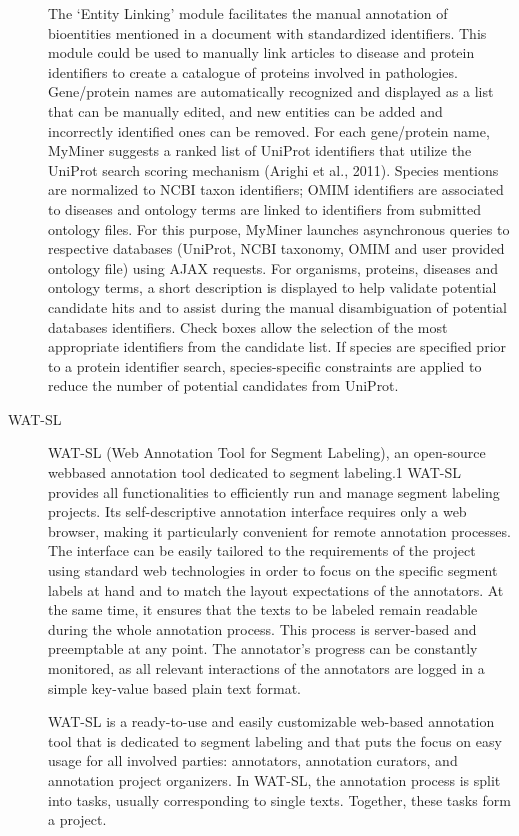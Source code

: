 \begin{description}
    The ‘Entity Linking’ module facilitates the manual annotation of bioentities mentioned in a document with standardized identifiers. This module could be used to manually link articles to disease and protein identifiers to create a catalogue of proteins involved in pathologies. Gene/protein names are automatically recognized and displayed as a list that can be manually edited, and new entities can be added and incorrectly identified ones can be removed. For each gene/protein name, MyMiner suggests a ranked list of UniProt identifiers that utilize the UniProt search scoring mechanism (Arighi et al., 2011). Species mentions are normalized to NCBI taxon identifiers; OMIM identifiers are associated to diseases and ontology terms are linked to identifiers from submitted ontology files. For this purpose, MyMiner launches asynchronous queries to respective databases (UniProt, NCBI taxonomy, OMIM and user provided ontology file) using AJAX requests. For organisms, proteins, diseases and ontology terms, a short description is displayed to help validate potential candidate hits and to assist during the manual disambiguation of potential databases identifiers. Check boxes allow the selection of the most appropriate identifiers from the candidate list. If species are specified prior to a protein identifier search, species-specific constraints are applied to reduce the number of potential candidates from UniProt.

    \item[WAT-SL] 
    WAT-SL (Web Annotation
    Tool for Segment Labeling), an open-source webbased annotation tool dedicated to segment labeling.1 WAT-SL provides all functionalities to efficiently run and manage segment labeling projects.
    Its self-descriptive annotation interface requires
    only a web browser, making it particularly convenient for remote annotation processes. The interface can be easily tailored to the requirements of
    the project using standard web technologies in order to focus on the specific segment labels at hand
    and to match the layout expectations of the annotators. At the same time, it ensures that the texts
    to be labeled remain readable during the whole
    annotation process. This process is server-based
    and preemptable at any point. The annotator’s
    progress can be constantly monitored, as all relevant interactions of the annotators are logged in a
    simple key-value based plain text format. 
    
    WAT-SL is a ready-to-use and easily customizable
    web-based annotation tool that is dedicated to segment labeling and that puts the focus on easy usage for all involved parties: annotators, annotation
    curators, and annotation project organizers.
    In WAT-SL, the annotation process is split into
tasks, usually corresponding to single texts. Together, these tasks form a project.


\end{description}
